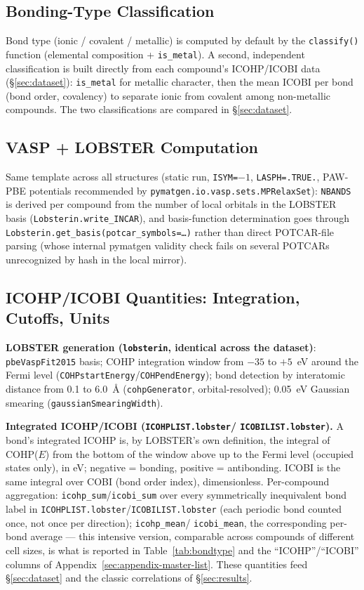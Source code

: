 \documentclass[11pt,a4paper]{article}
\begin{document}
\subsection{Bonding-Type Classification}

Bond type (ionic / covalent / metallic) is computed by default by the
\texttt{classify()} function (elemental composition + \texttt{is\_metal}).
A second, independent classification is built directly from each
compound's ICOHP/ICOBI data (\S\ref{sec:dataset}): \texttt{is\_metal}
for metallic character, then the mean ICOBI per bond (bond order,
covalency) to separate ionic from covalent among non-metallic
compounds. The two classifications are compared in \S\ref{sec:dataset}.

\subsection{VASP + LOBSTER Computation}

Same template across all structures (static run, \texttt{ISYM=$-1$},
\texttt{LASPH=.TRUE.}, PAW-PBE potentials recommended by
\texttt{pymatgen.io.vasp.sets.MPRelaxSet}): \texttt{NBANDS} is derived
per compound from the number of local orbitals in the LOBSTER basis
(\texttt{Lobsterin.write\_INCAR}), and basis-function determination goes
through \texttt{Lobsterin.get\_basis(potcar\_symbols=\ldots)} rather than
direct POTCAR-file parsing (whose internal pymatgen validity check fails
on several POTCARs unrecognized by hash in the local mirror).

\subsection{ICOHP/ICOBI Quantities: Integration, Cutoffs, Units}
\label{sec:icohp-methodo}

\textbf{LOBSTER generation (\texttt{lobsterin}, identical across the
dataset)}: \texttt{pbeVaspFit2015} basis; COHP integration window from
$-35$ to $+5$~eV around the Fermi level
(\texttt{COHPstartEnergy}/\texttt{COHPendEnergy}); bond detection by
interatomic distance from 0.1 to 6.0~\AA{} (\texttt{cohpGenerator},
orbital-resolved); 0.05~eV Gaussian smearing
(\texttt{gaussianSmearingWidth}).

\textbf{Integrated ICOHP/ICOBI (\texttt{ICOHPLIST.lobster}/
\texttt{ICOBILIST.lobster}).} A bond's integrated ICOHP is, by LOBSTER's
own definition, the integral of COHP($E$) from the bottom of the window
above up to the Fermi level (occupied states only), in eV; negative =
bonding, positive = antibonding. ICOBI is the same integral over COBI
(bond order index), dimensionless. Per-compound aggregation: \texttt{icohp\_sum}/\texttt{icobi\_sum}
over every symmetrically inequivalent bond label in
\texttt{ICOHPLIST.lobster}/\texttt{ICOBILIST.lobster} (each periodic bond
counted once, not once per direction); \texttt{icohp\_mean}/
\texttt{icobi\_mean}, the corresponding per-bond average --- this
intensive version, comparable across compounds of different cell sizes,
is what is reported in Table~\ref{tab:bondtype} and the
``ICOHP''/``ICOBI'' columns of
Appendix~\ref{sec:appendix-master-list}. These quantities feed
\S\ref{sec:dataset} and the classic correlations of \S\ref{sec:results}.
\end{document}

